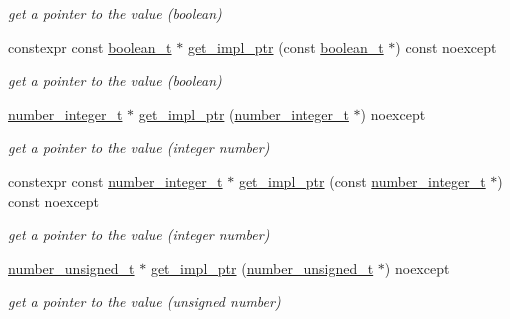 \begin{DoxyCompactItemize}
\begin{DoxyCompactList}\small\item\em get a pointer to the value (boolean) \end{DoxyCompactList}\item 
constexpr const \hyperlink{classnlohmann_1_1basic__json_a44fd1a12c9c54623c942b430e7a72937}{boolean\+\_\+t} $\ast$ \hyperlink{classnlohmann_1_1basic__json_a60a0febbb5030562424092fd134ce19d}{get\+\_\+impl\+\_\+ptr} (const \hyperlink{classnlohmann_1_1basic__json_a44fd1a12c9c54623c942b430e7a72937}{boolean\+\_\+t} $\ast$) const noexcept
\begin{DoxyCompactList}\small\item\em get a pointer to the value (boolean) \end{DoxyCompactList}\item 
\hyperlink{classnlohmann_1_1basic__json_a11e390944da90db83089eb2426a749d3}{number\+\_\+integer\+\_\+t} $\ast$ \hyperlink{classnlohmann_1_1basic__json_ab3ac4d7aa5bf26e70df1fdb2d6a2b207}{get\+\_\+impl\+\_\+ptr} (\hyperlink{classnlohmann_1_1basic__json_a11e390944da90db83089eb2426a749d3}{number\+\_\+integer\+\_\+t} $\ast$) noexcept
\begin{DoxyCompactList}\small\item\em get a pointer to the value (integer number) \end{DoxyCompactList}\item 
constexpr const \hyperlink{classnlohmann_1_1basic__json_a11e390944da90db83089eb2426a749d3}{number\+\_\+integer\+\_\+t} $\ast$ \hyperlink{classnlohmann_1_1basic__json_a12b8d90204a45d2cde4b2d22c861c384}{get\+\_\+impl\+\_\+ptr} (const \hyperlink{classnlohmann_1_1basic__json_a11e390944da90db83089eb2426a749d3}{number\+\_\+integer\+\_\+t} $\ast$) const noexcept
\begin{DoxyCompactList}\small\item\em get a pointer to the value (integer number) \end{DoxyCompactList}\item 
\hyperlink{classnlohmann_1_1basic__json_ae09af9c23351b7245d9be4d1b2035fef}{number\+\_\+unsigned\+\_\+t} $\ast$ \hyperlink{classnlohmann_1_1basic__json_aaacd6324154f273268cd75739b219347}{get\+\_\+impl\+\_\+ptr} (\hyperlink{classnlohmann_1_1basic__json_ae09af9c23351b7245d9be4d1b2035fef}{number\+\_\+unsigned\+\_\+t} $\ast$) noexcept
\begin{DoxyCompactList}\small\item\em get a pointer to the value (unsigned number) \end{DoxyCompactList}\item 

\end{DoxyCompactItemize}
